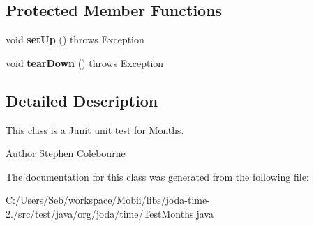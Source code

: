 \subsection*{Protected Member Functions}
\begin{DoxyCompactItemize}
\item 
\hypertarget{classorg_1_1joda_1_1time_1_1_test_months_ac6047f22e9105bfcd4696f0c37cf4468}{void {\bfseries set\-Up} ()  throws Exception }\label{classorg_1_1joda_1_1time_1_1_test_months_ac6047f22e9105bfcd4696f0c37cf4468}

\item 
\hypertarget{classorg_1_1joda_1_1time_1_1_test_months_a6e8185afd97b28db1f937bdd971630d1}{void {\bfseries tear\-Down} ()  throws Exception }\label{classorg_1_1joda_1_1time_1_1_test_months_a6e8185afd97b28db1f937bdd971630d1}

\end{DoxyCompactItemize}


\subsection{Detailed Description}
This class is a Junit unit test for \hyperlink{classorg_1_1joda_1_1time_1_1_months}{Months}.

\begin{DoxyAuthor}{Author}
Stephen Colebourne 
\end{DoxyAuthor}


The documentation for this class was generated from the following file\-:\begin{DoxyCompactItemize}
\item 
C\-:/\-Users/\-Seb/workspace/\-Mobii/libs/joda-\/time-\/2./src/test/java/org/joda/time/Test\-Months.\-java\end{DoxyCompactItemize}
